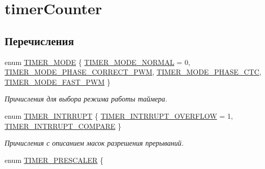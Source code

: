 \hypertarget{group__timer_counter}{}\section{timer\+Counter}
\label{group__timer_counter}
\subsection*{Перечисления}
\begin{DoxyCompactItemize}
\item 
enum \mbox{\hyperlink{group__timer_counter_ga15e57fd0ba6550341fe791c32292bea7}{T\+I\+M\+E\+R\+\_\+\+M\+O\+DE}} \{ \mbox{\hyperlink{group__timer_counter_gga15e57fd0ba6550341fe791c32292bea7a6a1047d7d57a907cc491fc1efeaeb7d1}{T\+I\+M\+E\+R\+\_\+\+M\+O\+D\+E\+\_\+\+N\+O\+R\+M\+AL}} = 0, 
\mbox{\hyperlink{group__timer_counter_gga15e57fd0ba6550341fe791c32292bea7ad2107c201a74fb8ba07717dec91d8e62}{T\+I\+M\+E\+R\+\_\+\+M\+O\+D\+E\+\_\+\+P\+H\+A\+S\+E\+\_\+\+C\+O\+R\+R\+E\+C\+T\+\_\+\+P\+WM}}, 
\mbox{\hyperlink{group__timer_counter_gga15e57fd0ba6550341fe791c32292bea7a5378d1ebe3379726f217de4b42ba96c9}{T\+I\+M\+E\+R\+\_\+\+M\+O\+D\+E\+\_\+\+P\+H\+A\+S\+E\+\_\+\+C\+TC}}, 
\mbox{\hyperlink{group__timer_counter_gga15e57fd0ba6550341fe791c32292bea7ae39b6fee84aef455cc1b3c228f3b64bb}{T\+I\+M\+E\+R\+\_\+\+M\+O\+D\+E\+\_\+\+F\+A\+S\+T\+\_\+\+P\+WM}}
 \}
\begin{DoxyCompactList}\small\item\em Причисления для выбора режима работы таймера. \end{DoxyCompactList}\item 
enum \mbox{\hyperlink{group__timer_counter_ga2e7008f5da185cf8ce62fb0e5f3079ff}{T\+I\+M\+E\+R\+\_\+\+I\+N\+T\+R\+R\+U\+PT}} \{ \mbox{\hyperlink{group__timer_counter_gga2e7008f5da185cf8ce62fb0e5f3079ffa0be0ffc6f43d64cc788928c368c5e550}{T\+I\+M\+E\+R\+\_\+\+I\+N\+T\+R\+R\+U\+P\+T\+\_\+\+O\+V\+E\+R\+F\+L\+OW}} = 1, 
\mbox{\hyperlink{group__timer_counter_gga2e7008f5da185cf8ce62fb0e5f3079ffa30e164ff279353323fb27a0a58660c53}{T\+I\+M\+E\+R\+\_\+\+I\+N\+T\+R\+R\+U\+P\+T\+\_\+\+C\+O\+M\+P\+A\+RE}}
 \}
\begin{DoxyCompactList}\small\item\em Причисления с описанием масок разрешения прерываний. \end{DoxyCompactList}\item 
enum \mbox{\hyperlink{group__timer_counter_ga7e6cbe0bc6f3395283c560bdc0690447}{T\+I\+M\+E\+R\+\_\+\+P\+R\+E\+S\+C\+A\+L\+ER}} \{ \newline

\end{DoxyCompactItemize}
